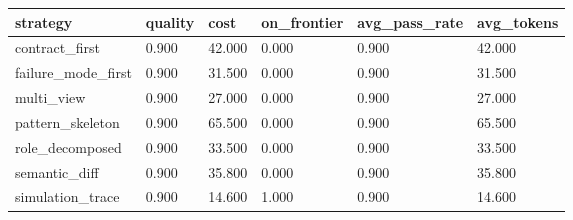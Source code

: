 \begin{tabular}{llllll}
\toprule
strategy & quality & cost & on\_frontier & avg\_pass\_rate & avg\_tokens \\
\midrule
contract\_first & 0.900 & 42.000 & 0.000 & 0.900 & 42.000 \\
failure\_mode\_first & 0.900 & 31.500 & 0.000 & 0.900 & 31.500 \\
multi\_view & 0.900 & 27.000 & 0.000 & 0.900 & 27.000 \\
pattern\_skeleton & 0.900 & 65.500 & 0.000 & 0.900 & 65.500 \\
role\_decomposed & 0.900 & 33.500 & 0.000 & 0.900 & 33.500 \\
semantic\_diff & 0.900 & 35.800 & 0.000 & 0.900 & 35.800 \\
simulation\_trace & 0.900 & 14.600 & 1.000 & 0.900 & 14.600 \\
\bottomrule
\end{tabular}

